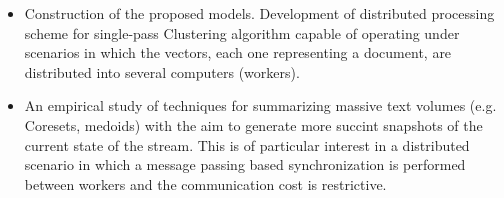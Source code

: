 \documentclass[10pt]{article}
\begin{document}
\begin{enumerate}
\begin{itemize}
\item Construction of the proposed models. Development of distributed processing scheme for single-pass Clustering algorithm capable of operating under scenarios in which the vectors, each one representing a document, are distributed into several computers (workers).

\item An empirical study of techniques for summarizing massive text volumes (e.g. Coresets, medoids) with the aim to generate more succint snapshots of the current state of the stream. This is of particular interest in a distributed scenario in which a message passing based synchronization is performed between workers and the communication cost is restrictive. 


\end{itemize}
\end{enumerate}
\end{document}
